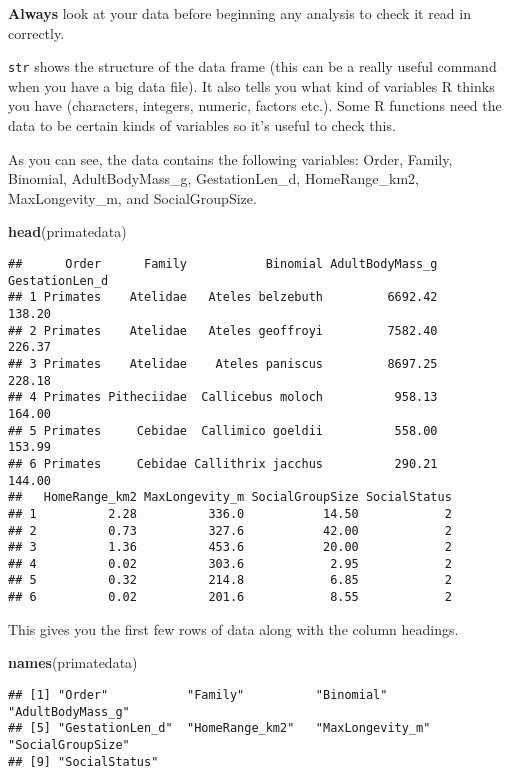 \documentclass[]{book}
\newenvironment{Shaded}{\begin{snugshade}}{\end{snugshade}}
\newcommand{\KeywordTok}[1]{\textcolor[rgb]{0.13,0.29,0.53}{\textbf{{#1}}}}
\newcommand{\NormalTok}[1]{{#1}}
\begin{document}
\textbf{Always} look at your data before beginning any analysis to check
it read in correctly.

\texttt{str} shows the structure of the data frame (this can be a really
useful command when you have a big data file). It also tells you what
kind of variables R thinks you have (characters, integers, numeric,
factors etc.). Some R functions need the data to be certain kinds of
variables so it's useful to check this.

As you can see, the data contains the following variables: Order,
Family, Binomial, AdultBodyMass\_g, GestationLen\_d, HomeRange\_km2,
MaxLongevity\_m, and SocialGroupSize.

\begin{Shaded}
\begin{Highlighting}[]
\KeywordTok{head}\NormalTok{(primatedata)}
\end{Highlighting}
\end{Shaded}

\begin{verbatim}
##      Order      Family           Binomial AdultBodyMass_g GestationLen_d
## 1 Primates    Atelidae   Ateles belzebuth         6692.42         138.20
## 2 Primates    Atelidae   Ateles geoffroyi         7582.40         226.37
## 3 Primates    Atelidae    Ateles paniscus         8697.25         228.18
## 4 Primates Pitheciidae  Callicebus moloch          958.13         164.00
## 5 Primates     Cebidae  Callimico goeldii          558.00         153.99
## 6 Primates     Cebidae Callithrix jacchus          290.21         144.00
##   HomeRange_km2 MaxLongevity_m SocialGroupSize SocialStatus
## 1          2.28          336.0           14.50            2
## 2          0.73          327.6           42.00            2
## 3          1.36          453.6           20.00            2
## 4          0.02          303.6            2.95            2
## 5          0.32          214.8            6.85            2
## 6          0.02          201.6            8.55            2
\end{verbatim}

This gives you the first few rows of data along with the column
headings.

\begin{Shaded}
\begin{Highlighting}[]
\KeywordTok{names}\NormalTok{(primatedata)}
\end{Highlighting}
\end{Shaded}

\begin{verbatim}
## [1] "Order"           "Family"          "Binomial"        "AdultBodyMass_g"
## [5] "GestationLen_d"  "HomeRange_km2"   "MaxLongevity_m"  "SocialGroupSize"
## [9] "SocialStatus"
\end{verbatim}
\end{document}
